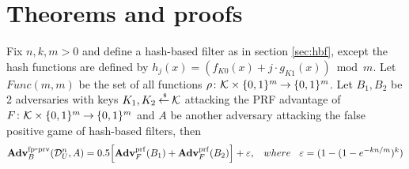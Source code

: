 \section{Theorems and proofs}
\begin{theorem}
Fix $n,k, m > 0$ and define a hash-based filter as in section \ref{sec:hbf}, except the hash functions are defined by $h_j(x) = \left( f_{K0}(x) + j\cdot g_{K1}(x)\right) \bmod m$. Let $Func(m,m)$ be the set of all functions $\rho \colon {\cal K} \times \{0,1\}^m {\:\stackrel{{\scriptscriptstyle \hspace{0.2em}}} {\rightarrow}\:} \{0,1\}^m$. Let $B_1, B_2$ be 2 adversaries with keys $K_1, K_2 {\:\stackrel{{\scriptscriptstyle \hspace{0.2em}\$}} {\leftarrow}\:} {\cal K}$ attacking the PRF advantage of $F \colon {\cal K} \times \{0,1\}^m {\:\stackrel{{\scriptscriptstyle \hspace{0.2em}}} {\rightarrow}\:} \{0,1\}^m$ and $A$ be another adversary attacking the false positive game of hash-based filters, then 
\begin{equation}
\mathrm{\mathbf{Adv}}^{\mathrm{fp\mbox{-}prv}}_{B}(\mathcal{D}_{U}^{n},A)  = 0.5\Big[\mathbf{Adv}^{\mathrm{prf}}_{F}(B_1) + \mathbf{Adv}^{\mathrm{prf}}_{F}(B_2)\Big] + \varepsilon, \hspace*{2ex} where \hspace*{2ex} \varepsilon = (1-(1-e^{-kn/m})^k)
\end{equation}

\end{theorem}


